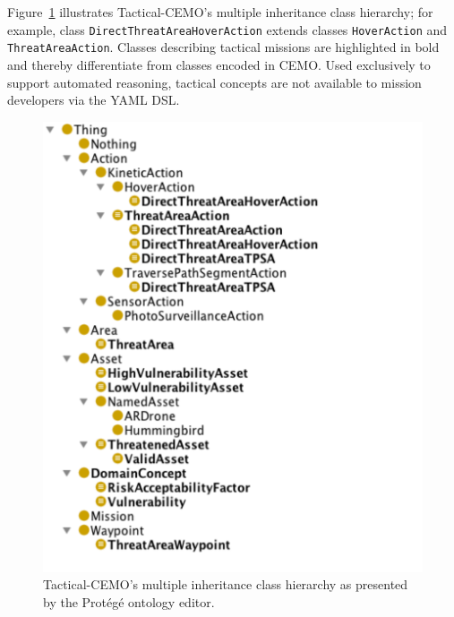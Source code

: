 Figure~\ref{fig:tactical_CEMO} illustrates Tactical-CEMO's multiple inheritance class hierarchy; for example, class \texttt{DirectThreatAreaHoverAction} extends classes \texttt{HoverAction} and \texttt{Threat\-AreaAction}. Classes describing tactical missions are highlighted in bold and thereby differentiate from classes encoded in CEMO\@. Used exclusively to support automated reasoning, tactical concepts are not available to mission developers via the YAML DSL\@.

\begin{figure}[ht]
\centering
\includegraphics[scale=0.63]{img/tactical-cemo.pdf}
\caption[Tactical-CEMO's class hierarchy]{Tactical-CEMO's multiple inheritance class hierarchy as presented by the Prot\'eg\'e ontology editor.}
\label{fig:tactical_CEMO}
\end{figure}

